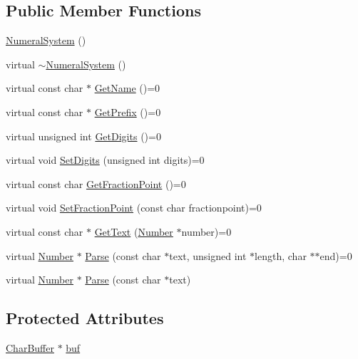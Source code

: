 \subsection*{Public Member Functions}
\begin{DoxyCompactItemize}
\item 
\hyperlink{classNumeralSystem_a1bca07a7784148e5505e77cf6ab97123}{Numeral\+System} ()
\item 
virtual \hyperlink{classNumeralSystem_a29ad089499c1d6d2fa8f921e37285b6f}{$\sim$\+Numeral\+System} ()
\item 
virtual const char $\ast$ \hyperlink{classNumeralSystem_a1bfe3fd463e687451a81f7a22cd4264b}{Get\+Name} ()=0
\item 
virtual const char $\ast$ \hyperlink{classNumeralSystem_a04d486781ac3a432fc4d8e0b1915e137}{Get\+Prefix} ()=0
\item 
virtual unsigned int \hyperlink{classNumeralSystem_ace143acf659454d7fa8ae119236b7700}{Get\+Digits} ()=0
\item 
virtual void \hyperlink{classNumeralSystem_acd05f991ab35e808f46eacef6d7a4fb8}{Set\+Digits} (unsigned int digits)=0
\item 
virtual const char \hyperlink{classNumeralSystem_a7212f107938ae55e780208518a16fa2f}{Get\+Fraction\+Point} ()=0
\item 
virtual void \hyperlink{classNumeralSystem_a5af49530e36feadbd24ef90206c5eceb}{Set\+Fraction\+Point} (const char fractionpoint)=0
\item 
virtual const char $\ast$ \hyperlink{classNumeralSystem_a74dc91c4dbab4a88a123b2a32753f485}{Get\+Text} (\hyperlink{structNumber}{Number} $\ast$number)=0
\item 
virtual \hyperlink{structNumber}{Number} $\ast$ \hyperlink{classNumeralSystem_af3643941efdda71a873e2a31276f2d49}{Parse} (const char $\ast$text, unsigned int $\ast$length, char $\ast$$\ast$end)=0
\item 
virtual \hyperlink{structNumber}{Number} $\ast$ \hyperlink{classNumeralSystem_a1f8d8a04e99540260d4fc4f16c63ddc3}{Parse} (const char $\ast$text)
\end{DoxyCompactItemize}
\subsection*{Protected Attributes}
\begin{DoxyCompactItemize}
\item 
\hyperlink{classCharBuffer}{Char\+Buffer} $\ast$ \hyperlink{classNumeralSystem_a03e7be944bf3fa5e4c34d80f135cd017}{buf}
\end{DoxyCompactItemize}


